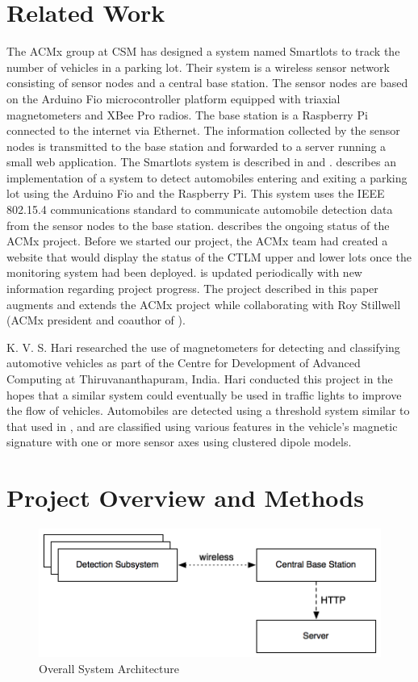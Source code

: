 \documentclass[11pt, oneside, fullpage, doublespace]{article}
\begin{document}
\section{Related Work}
The ACMx group at CSM has designed a system named Smartlots to track the number of vehicles in a parking lot. Their system is a wireless sensor network consisting of sensor nodes and a central base station. The sensor nodes are based on the Arduino Fio microcontroller platform equipped with triaxial magnetometers and XBee Pro radios. The base station is a Raspberry Pi connected to the internet via Ethernet. The information collected by the sensor nodes is transmitted to the base station and forwarded to a server running a small web application. The Smartlots system is described in \cite{stillwell2013} and \cite{parkingWiki}. \cite{stillwell2013} describes an implementation of a system to detect automobiles entering and exiting a parking lot using the Arduino Fio and the Raspberry Pi. This system uses the IEEE 802.15.4 communications standard to communicate automobile detection data from the sensor nodes to the base station. \cite{parkingWiki} describes the ongoing status of the ACMx project. Before we started our project, the ACMx team had created a website that would display the status of the CTLM upper and lower lots once the monitoring system had been deployed. \cite{parkingWiki} is updated periodically with new information regarding project progress. The project described in this paper augments and extends the ACMx project while collaborating with Roy Stillwell (ACMx president and coauthor of \cite{stillwell2013}).

K. V. S. Hari \cite{itsindia} researched the use of magnetometers for detecting and classifying automotive vehicles as part of the Centre for Development of Advanced Computing at Thiruvananthapuram, India. Hari conducted this project in the hopes that a similar system could eventually be used in traffic lights to improve the flow of vehicles. Automobiles are detected using a threshold system similar to that used in \cite{stillwell2013}, and are classified using various features in the vehicle's magnetic signature with one or more sensor axes using clustered dipole models.

\section{Project Overview and Methods}

\begin{figure}
\begin{center}
\includegraphics[width=4.5in]{architecture}
\end{center}
\caption{Overall System Architecture}
\label{fig:system}
\end{figure}
\end{document}
